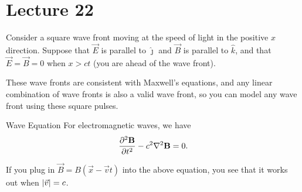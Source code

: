 \documentclass[class=article, crop=false]{standalone}
\begin{document}
  \section{Lecture 22}
  Consider a square wave front moving at the speed of light in the positive $x$ direction. Suppose that $\vec{E}$ is parallel to $\hat{\jmath}$ and $\vec{B}$ is parallel to $\hat{k}$, and that $\vec{E} = \vec{B} = 0$ when $x > ct$ (you are ahead of the wave front). \par
  These wave fronts are consistent with Maxwell's equations, and any linear combination of wave fronts is also a valid wave front, so you can model any wave front using these square pulses.
  \begin{theorem}{Wave Equation}
    For electromagnetic waves, we have
    \[
      \frac{\partial^2\mathbf{B}}{\partial t^2} - c^2\nabla^2\mathbf{B} = 0.
    \]
  \end{theorem}
  \begin{note}{}
    If you plug in $\vec{B} = B(\vec{x} - \vec{v}t)$ into the above equation, you see that it works out when $\left\lvert \vec{v} \right\rvert = c$.
  \end{note}
\end{document}
